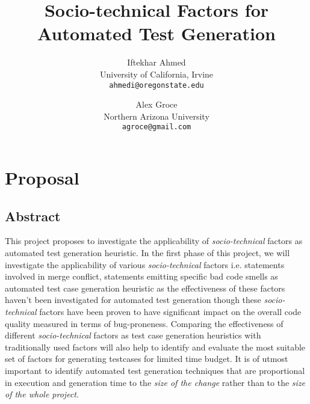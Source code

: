 \documentclass[10pt]{article}
\title{Socio-technical Factors for Automated Test Generation}
\author{
  Iftekhar Ahmed\\
  University of California, Irvine\\
  \texttt{ahmedi@oregonstate.edu}
  \and
  Alex Groce\\
  Northern Arizona University\\
  \texttt{agroce@gmail.com}
}
\date{}
\begin{document}
\maketitle

\section{Proposal}

\subsection{Abstract}

This project proposes to investigate the applicability of \emph{socio-technical} factors as automated test generation heuristic. In the first phase of this project, we will investigate the applicability of various \emph{socio-technical} factors i.e. statements involved in merge conflict, statements emitting specific bad code smells as automated test case generation heuristic as the effectiveness of these factors haven't been investigated for automated test generation though these \emph{socio-technical} factors have been proven to have significant impact on the overall code quality measured in terms of bug-proneness. Comparing the effectiveness of different \emph{socio-technical} factors as test case generation heuristics with traditionally used factors will also help to identify and evaluate the most suitable set of factors for generating testcases for limited time budget. It is of utmost important to identify automated test generation techniques that are proportional in execution and generation time to the \emph{size of the change} rather than to the \emph{size of the whole project}.
\end{document}
